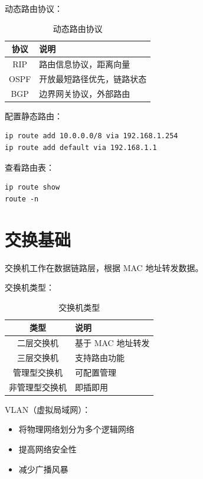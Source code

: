 \documentclass[12pt,UTF8]{ctexbook}
\begin{document}
动态路由协议：
\begin{table}[htbp]
    \centering
    \caption{动态路由协议}
    \begin{tabular}{|c|p{8cm}|}
        \hline
        \textbf{协议} & \textbf{说明} \\
        \hline
        RIP & 路由信息协议，距离向量 \\
        \hline
        OSPF & 开放最短路径优先，链路状态 \\
        \hline
        BGP & 边界网关协议，外部路由 \\
        \hline
    \end{tabular}
\end{table}

配置静态路由：
\begin{verbatim}
ip route add 10.0.0.0/8 via 192.168.1.254
ip route add default via 192.168.1.1
\end{verbatim}

查看路由表：
\begin{verbatim}
ip route show
route -n
\end{verbatim}

\section{交换基础}
\label{sec:switching}

交换机工作在数据链路层，根据 MAC 地址转发数据。

交换机类型：
\begin{table}[htbp]
    \centering
    \caption{交换机类型}
    \begin{tabular}{|c|p{8cm}|}
        \hline
        \textbf{类型} & \textbf{说明} \\
        \hline
        二层交换机 & 基于 MAC 地址转发 \\
        \hline
        三层交换机 & 支持路由功能 \\
        \hline
        管理型交换机 & 可配置管理 \\
        \hline
        非管理型交换机 & 即插即用 \\
        \hline
    \end{tabular}
\end{table}

VLAN（虚拟局域网）：
\begin{itemize}
    \item 将物理网络划分为多个逻辑网络
    \item 提高网络安全性
    \item 减少广播风暴
\end{itemize}
\end{document}
